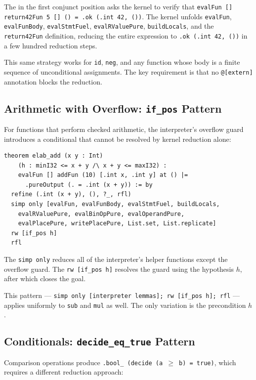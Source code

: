 The \rfl in the first conjunct position asks the kernel to verify that
\texttt{evalFun [] return42Fun 5 [] () = .ok (.int 42, ())}.
The kernel unfolds \texttt{evalFun}, \texttt{evalFunBody}, \texttt{evalStmtFuel},
\texttt{evalRValuePure}, \texttt{buildLocals}, and the \texttt{return42Fun}
definition, reducing the entire expression to \texttt{.ok (.int 42, ())} in
a few hundred reduction steps.

This same strategy works for \texttt{id}, \texttt{neg}, and any function
whose body is a finite sequence of unconditional assignments. The key
requirement is that no \texttt{@[extern]} annotation blocks the reduction.

\subsection{Arithmetic with Overflow: \texttt{if\_pos} Pattern}

For functions that perform checked arithmetic, the interpreter's overflow guard
introduces a conditional that cannot be resolved by kernel reduction alone:

\begin{lstlisting}[caption={F4: add with overflow precondition.},label={lst:addproof}]
theorem elab_add (x y : Int)
    (h : minI32 <= x + y /\ x + y <= maxI32) :
    evalFun [] addFun (10) [.int x, .int y] at () |=
      .pureOutput (. = .int (x + y)) := by
  refine (.int (x + y), (), ?_, rfl)
  simp only [evalFun, evalFunBody, evalStmtFuel, buildLocals,
    evalRValuePure, evalBinOpPure, evalOperandPure,
    evalPlacePure, writePlacePure, List.set, List.replicate]
  rw [if_pos h]
  rfl
\end{lstlisting}

The \texttt{simp only} reduces all of the interpreter's helper functions
except the overflow guard. The \texttt{rw [if\_pos h]} resolves the guard
using the hypothesis $h$, after which \rfl closes the goal.

This pattern — \texttt{simp only [interpreter lemmas]; rw [if\_pos h]; rfl}
— applies uniformly to \texttt{sub} and \texttt{mul} as well. The only
variation is the precondition $h$.

\subsection{Conditionals: \texttt{decide\_eq\_true} Pattern}

Comparison operations produce \texttt{.bool\_ (decide (a $\ge$ b) = true)},
which requires a different reduction approach:

